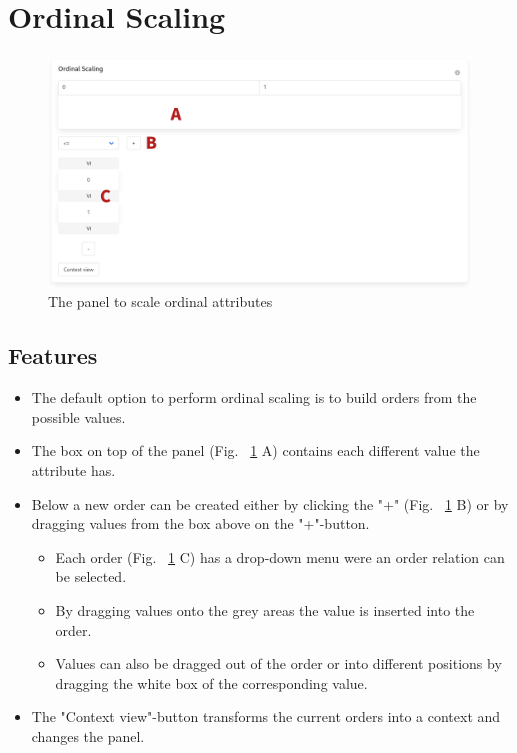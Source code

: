 \documentclass[]{article}
\begin{document}
\newpage
\section{Ordinal Scaling}
\begin{figure}[H]
	\includegraphics[width=\linewidth]{images/ordinal.png}
	\caption{The panel to scale ordinal attributes}
	\label{fig:p5}
\end{figure}
\subsection{Features}
\begin{itemize}
    \item The default option to perform ordinal scaling is to build orders from the possible values.
    \item The box on top of the panel (Fig. ~\ref{fig:p5} A) contains each different value the attribute has.
    \item Below a new order can be created either by clicking the "+" (Fig. ~\ref{fig:p5} B) or by dragging values from the box above on the "+"-button.
    \begin{itemize}
        \item Each order (Fig. ~\ref{fig:p5} C) has a drop-down menu were an order relation can be selected.
        \item By dragging values onto the grey areas the value is inserted into the order.
        \item Values can also be dragged out of the order or into different positions by dragging the white box of the corresponding value.
    \end{itemize}
    \item The "Context view"-button transforms the current orders into a context and changes the panel.
\end{itemize}
\end{document}
